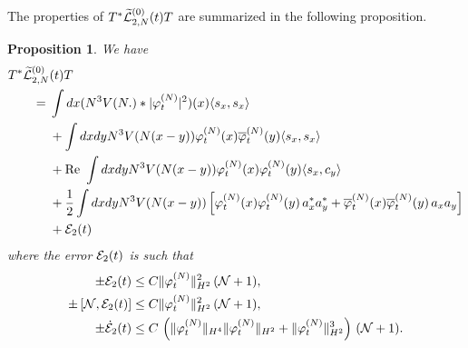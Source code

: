 \documentclass[11pt,a4paper,DIV11]{scrartcl}	%
\newtheorem{proposition}[thm]{Proposition}
\newcommand{\wt}{\widetilde}
\newcommand{\cE}{{\cal E}}
\newcommand{\cL}{{\cal L}}
\newcommand{\cN}{{\cal N}}
\begin{document}
The properties of $T^* \wt{\cL}_{2,N}^{(0)} (t) T$ are summarized in the following proposition.
\begin{proposition}\label{prop:TwtL2T}
We have 
\begin{equation} \begin{split} 
T^* \wt{\cL}_{2,N}^{(0)} &(t) T \\ =\; & \int dx (N^3 V(N.) * |\varphi_t^{(N)}|^2) (x) \langle s_x , s_x \rangle \\ &+ \int dx dy N^3 V(N (x-y)) \varphi_t^{(N)} (x) \overline{\varphi}_t^{(N)} (y) \langle s_x , s_x \rangle \\ &+ \text{Re } \int dx dy N^3 V(N (x-y)) \varphi_t^{(N)} (x) \varphi_t^{(N)} (y) \langle s_x ,c_y \rangle \\ &+ \frac{1}{2} \int dx dy N^3 V(N (x-y)) \left[ \varphi_t^{(N)} (x) \varphi_t^{(N)} (y)\, a_x^* a_y^*  + \overline{\varphi}_t^{(N)} (x) \overline{\varphi}_t^{(N)} (y) \, a_x a_y \right]  \\ &+ \cE_2 (t) \end{split} \end{equation}
where the error $\cE_2 (t)$ is such that 
\begin{equation} \label{eq:T2T-cl}
\begin{split}
\pm  \cE_2 (t) &\leq C \| \varphi_t^{(N)} \|_{H^2}^2 \,  (\cN + 1), \\  \pm \left[ \cN , \cE_2 (t) \right]  &\leq C \| \varphi_t^{(N)} \|_{H^2}^2 \, (\cN + 1), \\ \pm \dot{\cE}_2 (t) &\leq C \, \left(\| \varphi_t^{(N)} \|_{H^4} \| \varphi_t^{(N)} \|_{H^2} +   \| \varphi_t^{(N)} \|_{H^2}^3 \right) \, (\cN+1) .
\end{split}
\end{equation} 
\end{proposition}
\end{document}
